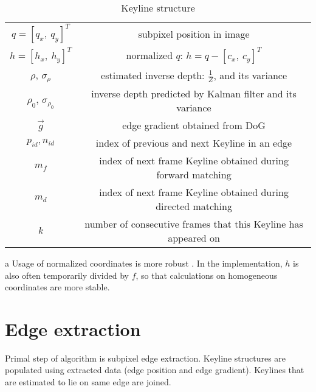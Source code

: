 \begin{table}[ht]
	\centering
	
	\begin{threeparttable}
		\caption{Keyline structure}
		\label{tab:keyline}
		
		\begin{tabularx}{1.0\textwidth}{C{0.25} C{0.75}}
			\toprule
			 &  \\
			\midrule
			$q = [q_{x},\ q_{y}]^T$ & subpixel position in image \\
			$h = [h_{x},\ h_{y}]^T$ & normalized $q$: $h = q - [c_{x},\ c_{y}]^T$ \\
			$\rho$, $\sigma_{\rho}$ & estimated inverse depth: $\frac{1}{Z}$, and its variance \\
			$\rho_0$, $\sigma_{\rho_{0}}$ & inverse depth predicted by Kalman filter and its variance \\
			$\vec{g}$ & edge gradient obtained from DoG \\
			$p_{id}, n_{id}$ & index of previous and next Keyline in an edge \\
			$m_f$ & index of next frame Keyline obtained during forward matching \\
			$m_d$ & index of next frame Keyline obtained during directed matching \\
			$k$ & number of consecutive frames that this Keyline has appeared on \\
			\bottomrule
		\end{tabularx}
		
		\begin{tablenotes}
			\footnotesize
			\item[a] Usage of normalized coordinates is more robust \cite{hartley1997defense}. In the implementation, $h$ is also often temporarily divided by $f$, so that calculations on homogeneous coordinates are more stable.
		\end{tablenotes}
		
	\end{threeparttable}
\end{table}


\section{Edge extraction}

Primal step of algorithm is subpixel edge extraction. Keyline structures are populated using extracted data (edge position and edge gradient). Keylines that are estimated to lie on same edge are joined.

